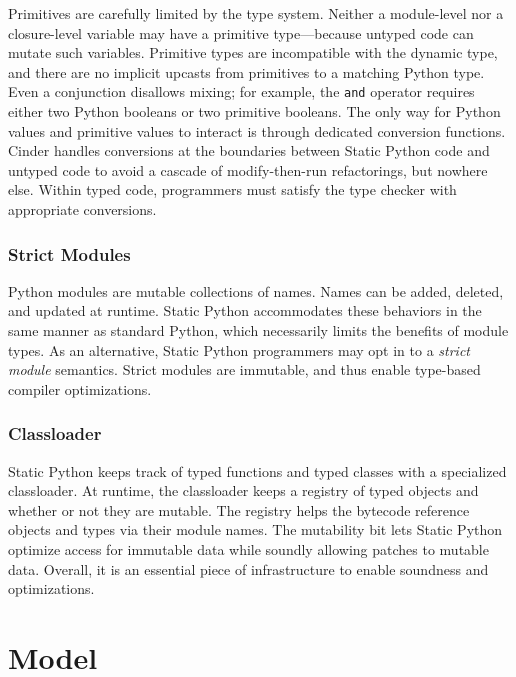 \documentclass[english,cleveref,submission]{programming}
\newcommand{\SP}{Static Python}
\newcommand{\code}[1]{\texttt{#1}}
\begin{document}
Primitives are carefully limited by the type system.
Neither a module-level nor a closure-level variable may have a primitive
type---because untyped code can mutate such variables.
Primitive types are incompatible with the dynamic type,
and there are no implicit upcasts from primitives
to a matching Python type.
Even a conjunction disallows mixing; for example, the \code{and} operator
requires either two Python booleans or two primitive booleans.
The only way for Python values and primitive values to interact
is through dedicated conversion functions.
Cinder handles conversions at the boundaries between \SP{} code
and untyped code to avoid a cascade of modify-then-run refactorings, but nowhere else.
Within typed code, programmers must satisfy the type checker with
appropriate conversions.




\subsubsection{Strict Modules}
\label{s:strict-mod}

Python modules are mutable collections of names.
Names can be added, deleted, and updated at runtime.
\SP{} accommodates these behaviors in the same manner as standard Python, which
necessarily limits the benefits of module types.
As an alternative, \SP{} programmers may opt in to a \emph{strict module} semantics.
Strict modules are immutable, and thus enable type-based compiler optimizations.


\subsubsection{Classloader}
\label{s:classloader}

\SP{} keeps track of typed functions and typed classes with a specialized classloader.
At runtime, the classloader keeps a registry of typed objects and whether or not they
are mutable.
The registry helps the bytecode reference objects and types via their module names.
The mutability bit lets \SP{} optimize access for immutable data while soundly allowing
patches to mutable data.
Overall, it is an essential piece of infrastructure to enable soundness and optimizations.


\section{Model}
\label{s:model}
\end{document}
